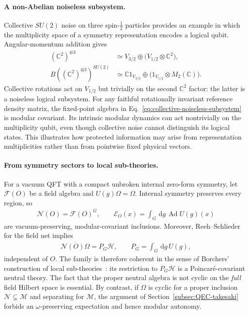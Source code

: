 \documentclass[a4paper,11pt]{article}
\theoremstyle{definition}
\newcommand{\dd}{\,\mathrm{d}}
\newcommand{\cH}{\mathcal{H}}
\newcommand{\mN}{\mathcal{N}}
\newcommand{\mM}{\mathcal{M}}
\begin{document}
\paragraph{A non-Abelian noiseless subsystem.}
Collective $SU(2)$ noise on three spin-$\frac12$ particles provides an
example in which the multiplicity space of a symmetry representation
encodes a logical qubit. Angular-momentum addition gives
\begin{align}
 (\mathbb C^2)^{\otimes3}
 &\simeq V_{3/2}\oplus\bigl(V_{1/2}\otimes\mathbb C^2\bigr),\nonumber\\
 B((\mathbb C^2)^{\otimes3})^{SU(2)}
 &\simeq\mathbb C1_{V_{3/2}}\oplus
       \bigl(1_{V_{1/2}}\otimes M_2(\mathbb C)\bigr).
 \label{eq:collective-noiseless-subsystem}
\end{align}
Collective rotations act on $V_{1/2}$ but trivially on the second
$\mathbb C^2$ factor: the latter is a noiseless logical subsystem.
For any faithful rotationally invariant reference density matrix, the
fixed-point algebra in Eq.~\eqref{eq:collective-noiseless-subsystem}
is modular covariant. Its intrinsic modular dynamics can act
nontrivially on the multiplicity qubit, even though collective noise
cannot distinguish its logical states. This illustrates how protected
information may arise from representation multiplicities rather than
from pointwise fixed physical vectors.

\paragraph{From symmetry sectors to local sub-theories.}
For a vacuum QFT with a compact unbroken internal zero-form symmetry,
let $\mathcal F(O)$ be a field algebra and $U(g)\Omega=\Omega$. Internal
symmetry preserves every region, so
\begin{align}
 \mathcal N(O)=\mathcal F(O)^G,\qquad
 \mathcal E_O(x)=\int_G\dd g\,\operatorname{Ad}U(g)(x)
 \label{eq:internal-neutral-net}
\end{align}
are vacuum-preserving, modular-covariant inclusions. Moreover,
Reeh--Schlieder for the field net implies
\begin{align}
 \overline{\mathcal N(O)\Omega}=P_G\cH,
 \qquad P_G=\int_G\dd g\,U(g),
 \label{eq:internal-coherent-projection}
\end{align}
independent of $O$. The family is therefore coherent in the sense of
Borchers' construction of local sub-theories~\cite{revolutionizing}:
its restriction to $P_G\cH$ is a Poincar\'e-covariant neutral theory.
The fact that the proper neutral algebra is not cyclic on the \emph{full}
field Hilbert space is essential. By contrast, if $\Omega$ is cyclic for
a proper inclusion $\mN\subsetneq\mM$ and separating for $\mM$, the
argument of Section~\ref{subsec:QEC-takesaki} forbids an
$\omega$-preserving expectation and hence modular autonomy.
\end{document}
